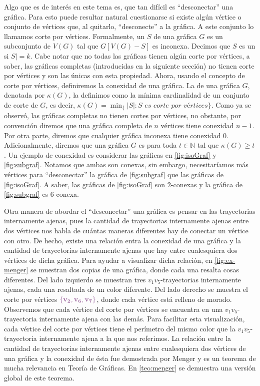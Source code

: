 Algo que es de inter\'es en este tema es, que tan dif\'icil es ``desconectar''
una gr\'afica. Para esto puede resultar natural cuestionarse si existe alg\'un
v\'ertice o conjunto de v\'ertices que, al quitarlo, ``desconecte'' a la
gr\'afica. A este conjunto lo llamamos corte por v\'ertices. Formalmente, un
 $S$ de una gr\'afica $G$ es un subconjunto de
$V(G)$ tal que $G[V(G)-S]$ es inconexa. Decimos que $S$ es un  si $S|=k$. Cabe notar que no todas las gr\'aficas tienen alg\'un
corte por v\'ertices, a saber, las gr\'aficas completas (introducidas en la
siguiente secci\'on) no tienen corte por v\'ertices y son las \'unicas con esta
propiedad. Ahora, usando el concepto de corte por v\'ertices, definiremos la
conexidad de una gr\'afica. La  de una gr\'afica $G$, denotada
por $\kappa(G)$, la definimos como la m\'inima cardinalidad de un conjunto de
corte de $G$, es decir, $\kappa(G)=\min_\{|S| \colon S \textit{ es corte por
v\'ertices}\}$. Como ya se observ\'o, las gr\'aficas completas no tienen cortes
por v\'ertices, no obstante, por convenci\'on diremos que una gr\'afica completa
de $n$ v\'ertices tiene conexidad $n-1$. Por otra parte, diremos que cualquier
gr\'afica inconexa tiene conexidad $0$. Adicionalmente, diremos que una
gr\'afica $G$ es  para toda $t \in \mathbb{N}$
tal que $\kappa(G)\geq t$. Un ejemplo de conexidad es considerar las gr\'aficas
en \cref{fig:isoGraf} y \cref{fig:subgraf}. Notamos que ambas son conexas, sin
embargo, necesitar\'iamos m\'as v\'ertices para ``desconectar'' la gr\'afica de
\cref{fig:subgraf} que las gr\'aficas de \cref{fig:isoGraf}. A saber, las
gr\'aficas de \cref*{fig:isoGraf} son $2$-conexas y la gr\'afica de
\cref{fig:subgraf} es $6$-conexa.

Otra manera de abordar el ``desconectar'' una gr\'afica es  pensar en las
trayectorias internamente ajenas, pues la cantidad de trayectorias internamente
ajenas entre dos v\'ertices nos habla de cu\'antas maneras diferentes hay de
conectar un v\'ertice con otro. De hecho, existe una relaci\'on entra la
conexidad de una gr\'afica y la cantidad de trayectorias internamente ajenas que
hay entre cualesquiera dos v\'ertices de dicha gr\'afica. Para ayudar a
visualizar dicha relaci\'on, en \cref{fig:ex-menger} se muestran dos copias de
una gr\'afica, donde cada una resalta cosas diferentes. Del lado izquierdo se
muestran tres $v_1v_5$-trayectorias internamente ajenas, cada una resaltada de
un color diferente. Del lado derecho se muestra el corte por v\'ertices
${\color{morado}\bf \{v_2, v_6, v_7\} }$, donde cada v\'ertice est\'a relleno de
morado. Observemos que cada v\'ertice del corte por v\'ertices se encuentra en
una $v_1v_5$-trayectoria internamente ajena con las dem\'as. Para facilitar esta
visualizaci\'on, cada v\'ertice del corte por v\'ertices tiene el per\'imetro
del mismo color que la $v_1v_5$-trayectoria internamente ajena a la que nos
referimos. La relaci\'on entre la cantidad de trayectorias internamente ajenas
entre cualesquiera dos v\'ertices de una gr\'afica y la conexidad de \'esta fue
demostrada por Menger y es un teorema de mucha relevancia en Teor\'ia de
Gr\'aficas. En \cref*{teo:menger} se demuestra una versi\'on global de este
teorema. 

